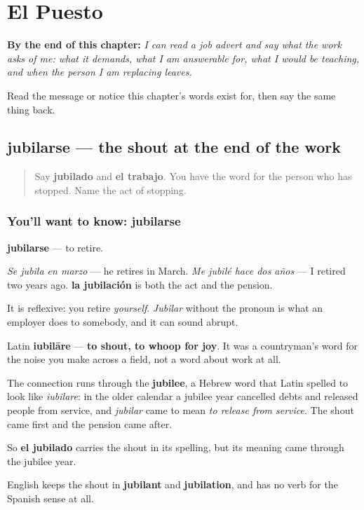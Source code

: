 
\chapter{El Puesto}
\label{ch:es-puesto}

\begin{chapteropening}
\textbf{By the end of this chapter:} \emph{I can read a job advert and say what the work asks of me: what it demands, what I am answerable for, what I would be teaching, and when the person I am replacing leaves.}

Read the message or notice this chapter's words exist for, then say the same thing back.
\end{chapteropening}

\section[jubilarse]{jubilarse — the shout at the end of the work}

\label{lesson:ES-C445-jubilarse}



\begin{quote}
Say \textbf{jubilado} and \textbf{el trabajo}. You have the word for the person who has stopped. Name the act of stopping.
\end{quote}

\subsection*{You'll want to know: jubilarse}
\textbf{jubilarse} — to retire.

\emph{Se jubila en marzo} — he retires in March. \emph{Me jubilé hace dos años} — I retired two years ago. \textbf{la jubilación} is both the act and the pension.

It is reflexive: you retire \emph{yourself}. \emph{Jubilar} without the pronoun is what an employer does to somebody, and it can sound abrupt.

\begin{cousinweb}
Latin \textbf{iubilāre} — \textbf{to shout, to whoop for joy}. It was a countryman's word for the noise you make across a field, not a word about work at all.

The connection runs through the \textbf{jubilee}, a Hebrew word that Latin spelled to look like \emph{iubilare}: in the older calendar a jubilee year cancelled debts and released people from service, and \emph{jubilar} came to mean \emph{to release from service}. The shout came first and the pension came after.

So \textbf{el jubilado} carries the shout in its spelling, but its meaning came through the jubilee year.

English keeps the shout in \textbf{jubilant} and \textbf{jubilation}, and has no verb for the Spanish sense at all.
\end{cousinweb}

